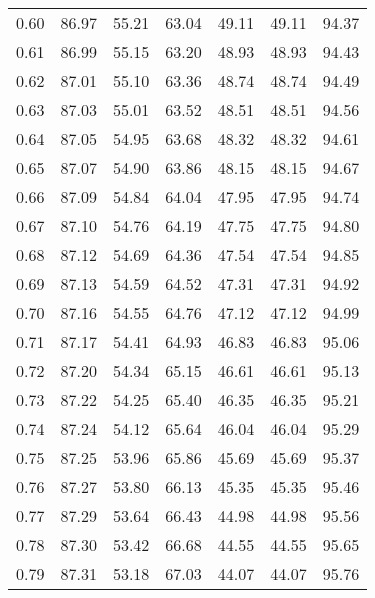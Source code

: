 \begin{tabular}{|c|c|c|c|c|c|c|}
      0.60 &     86.97 &     55.21 &      63.04 &   49.11 &      49.11 &         94.37 \\
      0.61 &     86.99 &     55.15 &      63.20 &   48.93 &      48.93 &         94.43 \\
      0.62 &     87.01 &     55.10 &      63.36 &   48.74 &      48.74 &         94.49 \\
      0.63 &     87.03 &     55.01 &      63.52 &   48.51 &      48.51 &         94.56 \\
      0.64 &     87.05 &     54.95 &      63.68 &   48.32 &      48.32 &         94.61 \\
      0.65 &     87.07 &     54.90 &      63.86 &   48.15 &      48.15 &         94.67 \\
      0.66 &     87.09 &     54.84 &      64.04 &   47.95 &      47.95 &         94.74 \\
      0.67 &     87.10 &     54.76 &      64.19 &   47.75 &      47.75 &         94.80 \\
      0.68 &     87.12 &     54.69 &      64.36 &   47.54 &      47.54 &         94.85 \\
      0.69 &     87.13 &     54.59 &      64.52 &   47.31 &      47.31 &         94.92 \\
      0.70 &     87.16 &     54.55 &      64.76 &   47.12 &      47.12 &         94.99 \\
      0.71 &     87.17 &     54.41 &      64.93 &   46.83 &      46.83 &         95.06 \\
      0.72 &     87.20 &     54.34 &      65.15 &   46.61 &      46.61 &         95.13 \\
      0.73 &     87.22 &     54.25 &      65.40 &   46.35 &      46.35 &         95.21 \\
      0.74 &     87.24 &     54.12 &      65.64 &   46.04 &      46.04 &         95.29 \\
      0.75 &     87.25 &     53.96 &      65.86 &   45.69 &      45.69 &         95.37 \\
      0.76 &     87.27 &     53.80 &      66.13 &   45.35 &      45.35 &         95.46 \\
      0.77 &     87.29 &     53.64 &      66.43 &   44.98 &      44.98 &         95.56 \\
      0.78 &     87.30 &     53.42 &      66.68 &   44.55 &      44.55 &         95.65 \\
      0.79 &     87.31 &     53.18 &      67.03 &   44.07 &      44.07 &         95.76 \\

\end{tabular}
